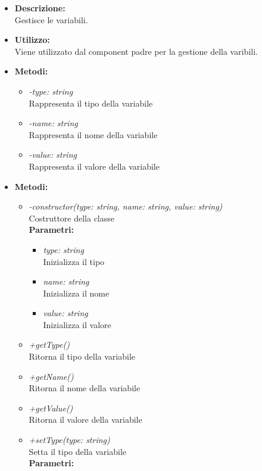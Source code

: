 \begin{itemize}
	\item \textbf{Descrizione:}\\
	Gestisce le variabili.
	\item \textbf{Utilizzo:}\\
	Viene utilizzato dal component padre per la gestione della varibili.
	\item \textbf{Metodi:}
		\begin{itemize}
			\item \emph{-type: string}\\
    		Rappresenta il tipo della variabile
    		\item \emph{-name: string}\\
    		Rappresenta il nome della variabile
    		\item \emph{-value: string}\\
    		Rappresenta il valore della variabile
		\end{itemize}
	\item \textbf{Metodi:}
		\begin{itemize}
			\item \emph{-constructor(type: string, name: string, value: string)}\\
    		Costruttore della classe\\
    		\textbf{Parametri:}
    		\begin{itemize}
    			\item \emph{type: string}\\
    			Inizializza il tipo
    			\item \emph{name: string}\\
    			Inizializza il nome
    			\item \emph{value: string}\\
    			Inizializza il valore
    		\end{itemize}
    		\item \emph{+getType()}\\
    		Ritorna il tipo della variabile
    		\item \emph{+getName()}\\
    		Ritorna il nome della variabile
    		\item \emph{+getValue()}\\
    		Ritorna il valore della variabile
    		\item \emph{+setType(type: string)}\\
    		Setta il tipo della variabile\\
    		\textbf{Parametri:}

\end{itemize}
\end{itemize}

